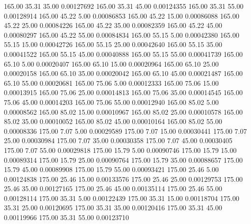     165.00     35.31     35.00     0.00127692
    165.00     35.31     45.00     0.00124355
    165.00     35.31     55.00     0.00128914
    165.00     45.22      5.00     0.00086853
    165.00     45.22     15.00     0.00086088
    165.00     45.22     25.00     0.00084226
    165.00     45.22     35.00     0.00082359
    165.00     45.22     45.00     0.00080297
    165.00     45.22     55.00     0.00084834
    165.00     55.15      5.00     0.00042380
    165.00     55.15     15.00     0.00042726
    165.00     55.15     25.00     0.00042640
    165.00     55.15     35.00     0.00041522
    165.00     55.15     45.00     0.00040888
    165.00     55.15     55.00     0.00041739
    165.00     65.10      5.00     0.00020407
    165.00     65.10     15.00     0.00020964
    165.00     65.10     25.00     0.00020158
    165.00     65.10     35.00     0.00020042
    165.00     65.10     45.00     0.00021487
    165.00     65.10     55.00     0.00020681
    165.00     75.06      5.00     0.00012333
    165.00     75.06     15.00     0.00013915
    165.00     75.06     25.00     0.00014813
    165.00     75.06     35.00     0.00014545
    165.00     75.06     45.00     0.00014203
    165.00     75.06     55.00     0.00012940
    165.00     85.02      5.00     0.00008562
    165.00     85.02     15.00     0.00010967
    165.00     85.02     25.00     0.00010578
    165.00     85.02     35.00     0.00010052
    165.00     85.02     45.00     0.00010164
    165.00     85.02     55.00     0.00008336
    175.00      7.07      5.00     0.00029589
    175.00      7.07     15.00     0.00030441
    175.00      7.07     25.00     0.00030984
    175.00      7.07     35.00     0.00030358
    175.00      7.07     45.00     0.00030405
    175.00      7.07     55.00     0.00029818
    175.00     15.79      5.00     0.00090746
    175.00     15.79     15.00     0.00089314
    175.00     15.79     25.00     0.00090764
    175.00     15.79     35.00     0.00088657
    175.00     15.79     45.00     0.00089908
    175.00     15.79     55.00     0.00093421
    175.00     25.46      5.00     0.00124838
    175.00     25.46     15.00     0.00133576
    175.00     25.46     25.00     0.00129753
    175.00     25.46     35.00     0.00127165
    175.00     25.46     45.00     0.00135114
    175.00     25.46     55.00     0.00128114
    175.00     35.31      5.00     0.00122439
    175.00     35.31     15.00     0.00118704
    175.00     35.31     25.00     0.00120695
    175.00     35.31     35.00     0.00120416
    175.00     35.31     45.00     0.00119966
    175.00     35.31     55.00     0.00123710
